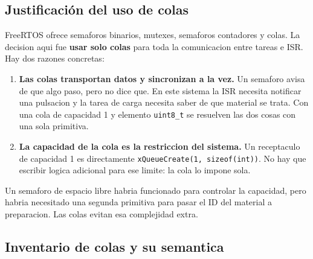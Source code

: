 \documentclass[12pt,a4paper]{article}
\begin{document}
\subsection{Justificación del uso de colas}

FreeRTOS ofrece semaforos binarios, mutexes, semaforos contadores y colas. La decision aqui fue \textbf{usar solo colas} para toda la comunicacion entre tareas e ISR. Hay dos razones concretas:

\begin{enumerate}
    \item \textbf{Las colas transportan datos y sincronizan a la vez.} Un semaforo avisa de que algo paso, pero no dice que. En este sistema la ISR necesita notificar una pulsacion y la tarea de carga necesita saber de que material se trata. Con una cola de capacidad 1 y elemento \texttt{uint8\_t} se resuelven las dos cosas con una sola primitiva.
    \item \textbf{La capacidad de la cola es la restriccion del sistema.} Un receptaculo de capacidad 1 es directamente \texttt{xQueueCreate(1, sizeof(int))}. No hay que escribir logica adicional para ese limite: la cola lo impone sola.
\end{enumerate}

Un semaforo de espacio libre habria funcionado para controlar la capacidad, pero habria necesitado una segunda primitiva para pasar el ID del material a preparacion. Las colas evitan esa complejidad extra.

\subsection{Inventario de colas y su semantica}
\end{document}
